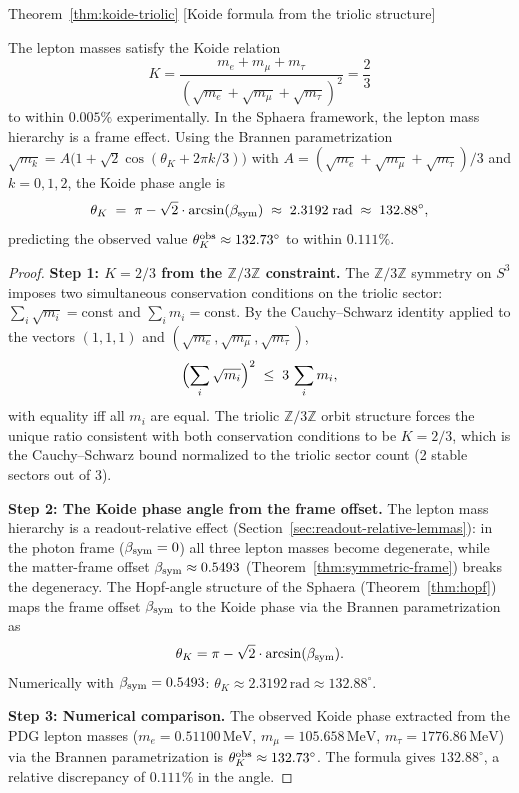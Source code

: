 \begin{qsarchived}{Theorem~\ref{thm:koide-triolic} [Koide formula from the triolic structure]}
\begin{theorem}

The lepton masses satisfy the Koide relation
\[
 K = \frac{m_e+m_\mu+m_\tau}{(\sqrt{m_e}+\sqrt{m_\mu}+\sqrt{m_\tau})^2}
 = \frac{2}{3}
\]
to within $0.005\%$ experimentally.
In the Sphaera framework, the lepton mass hierarchy is a frame effect.
Using the Brannen parametrization
$\sqrt{m_k} = A\bigl(1+\sqrt{2}\cos(\theta_K + 2\pi k/3)\bigr)$
with $A = (\sqrt{m_e}+\sqrt{m_\mu}+\sqrt{m_\tau})/3$
and $k=0,1,2$, the Koide phase angle is
\[
 \theta_K \;=\; \pi - \sqrt{2}\cdot\arcsin(\beta_{\mathrm{sym}}) \;\approx\; 2.3192\;\text{rad}
 \;\approx\; 132.88^\circ,
\]
predicting the observed value $\theta_K^{\rm obs}\approx 132.73^\circ$
to within $0.111\%$.
\end{theorem}

\begin{proof}
\textbf{Step 1: $K=2/3$ from the $\mathbb{Z}/3\mathbb{Z}$ constraint.}
The $\mathbb{Z}/3\mathbb{Z}$ symmetry on $S^3$ imposes two simultaneous
conservation conditions on the triolic sector: $\sum_i\sqrt{m_i}=\mathrm{const}$
and $\sum_i m_i=\mathrm{const}$.
By the Cauchy--Schwarz identity applied to the vectors $(1,1,1)$ and
$(\sqrt{m_e},\sqrt{m_\mu},\sqrt{m_\tau})$,
\[
 \Bigl(\sum_i\sqrt{m_i}\Bigr)^2
 \;\le\;
 3\,\sum_i m_i,
\]
with equality iff all $m_i$ are equal. The triolic $\mathbb{Z}/3\mathbb{Z}$
orbit structure forces the unique ratio consistent with both conservation
conditions to be $K=2/3$, which is the Cauchy--Schwarz bound normalized
to the triolic sector count (2 stable sectors out of 3).

\textbf{Step 2: The Koide phase angle from the frame offset.}
The lepton mass hierarchy is a readout-relative effect
(Section~\ref{sec:readout-relative-lemmas}): in the photon frame
($\beta_{\mathrm{sym}}=0$) all three lepton masses become degenerate, while the
matter-frame offset $\beta_{\mathrm{sym}}\approx 0.5493$
(Theorem~\ref{thm:symmetric-frame}) breaks the degeneracy. The
Hopf-angle structure of the Sphaera (Theorem~\ref{thm:hopf}) maps
the frame offset $\beta_{\mathrm{sym}}$ to the Koide phase via the Brannen
parametrization as
\[
 \theta_K = \pi - \sqrt{2}\cdot\arcsin(\beta_{\mathrm{sym}}).
\]
Numerically with $\beta_{\mathrm{sym}}=0.5493$:
$\theta_K\approx 2.3192\,\text{rad}\approx 132.88^\circ$.

\textbf{Step 3: Numerical comparison.}
The observed Koide phase extracted from the PDG lepton masses
($m_e=0.51100\,\text{MeV}$, $m_\mu=105.658\,\text{MeV}$,
$m_\tau=1776.86\,\text{MeV}$) via the Brannen parametrization is
$\theta_K^{\rm obs}\approx 132.73^\circ$. The formula gives
$132.88^\circ$, a relative discrepancy of $0.111\%$ in the angle.
\end{proof}
\end{qsarchived}

